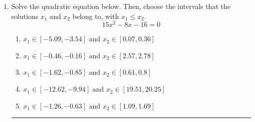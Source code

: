 \documentclass[14pt]{extbook}
\newcommand{\litem}[1]{\item#1\hspace*{-1cm}\rule{\textwidth}{0.4pt}}
\begin{document}
\begin{enumerate}
{\begin{enumerate}[label=\Alph*.]
\end{enumerate} }
\litem{
Solve the quadratic equation below. Then, choose the intervals that the solutions $x_1$ and $x_2$ belong to, with $x_1 \leq x_2$.\[ 15x^{2} -8 x -16 = 0 \]\begin{enumerate}[label=\Alph*.]
\item \( x_1 \in [-5.09, -3.54] \text{ and } x_2 \in [0.07, 0.36] \)
\item \( x_1 \in [-0.46, -0.16] \text{ and } x_2 \in [2.57, 2.78] \)
\item \( x_1 \in [-1.62, -0.85] \text{ and } x_2 \in [0.61, 0.8] \)
\item \( x_1 \in [-12.62, -9.94] \text{ and } x_2 \in [19.51, 20.25] \)
\item \( x_1 \in [-1.26, -0.63] \text{ and } x_2 \in [1.09, 1.69] \)


\end{enumerate}}
\end{enumerate}
\end{document}
